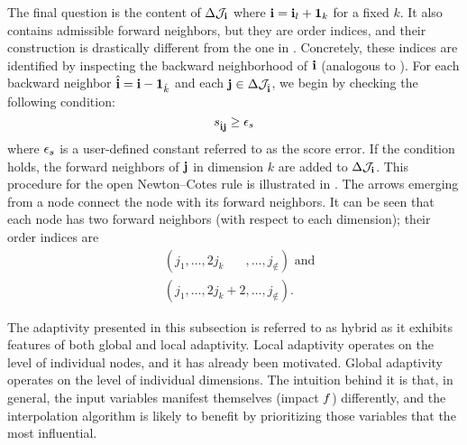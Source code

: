 The final question is the content of $\Delta\mathcal{J}_{\mathbf{i}}$ where $\mathbf{i} = \mathbf{i}_l +
\mathbf{1}_k$ for a fixed $k$. It also contains admissible forward neighbors, but
they are order indices, and their construction is drastically different from the
one in . Concretely, these indices are identified
by inspecting the backward neighborhood of $\mathbf{i}$ (analogous to
). For each backward neighbor $\hat{\mathbf{i}} = \mathbf{i} -
\mathbf{1}_{\hat{k}}$ and each $\mathbf{j} \in \Delta\mathcal{J}_{\hat{\mathbf{i}}}$, we begin by
checking the following condition:
\[
  s_{\hat{\mathbf{i}}\mathbf{j}} \geq \epsilon_s
\]
where $\epsilon_s$ is a user-defined constant referred to as the score error. If
the condition holds, the forward neighbors of $\mathbf{j}$ in dimension $k$ are added
to $\Delta\mathcal{J}_{\mathbf{i}}$. This procedure for the open Newton--Cotes rule is
illustrated in . The arrows emerging from a node connect the node
with its forward neighbors. It can be seen that each node has two forward
neighbors (with respect to each dimension); their order indices are
\begin{align*}
  &(j_1, \dots, 2 j_k \phantom{{} + 0}, \dots, j_\nin) \text{ and} \\
  &(j_1, \dots, 2 j_k + 2, \dots, j_\nin).
\end{align*}

The adaptivity presented in this subsection is referred to as hybrid as it
exhibits features of both global and local adaptivity. Local adaptivity operates
on the level of individual nodes, and it has already been motivated. Global
adaptivity operates on the level of individual dimensions. The intuition behind
it is that, in general, the input variables manifest themselves (impact $f$)
differently, and the interpolation algorithm is likely to benefit by
prioritizing those variables that the most influential.
